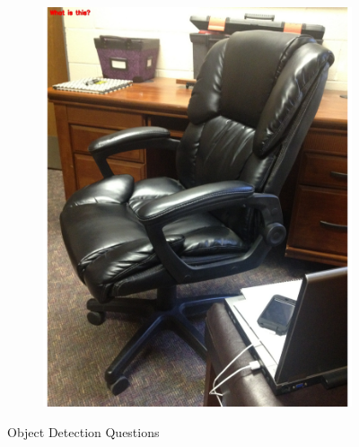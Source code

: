 \documentclass[sigconf]{acmart}
\begin{document}
\begin{figure}[hbp]
\begin{subfigure}[b]{0.4\columnwidth}
                \includegraphics[width=\textwidth]{images/object_2.pdf}  
        \end{subfigure}%
        \caption{Object Detection Questions} 
        \label{fig:object}
\end{figure}
\end{document}
